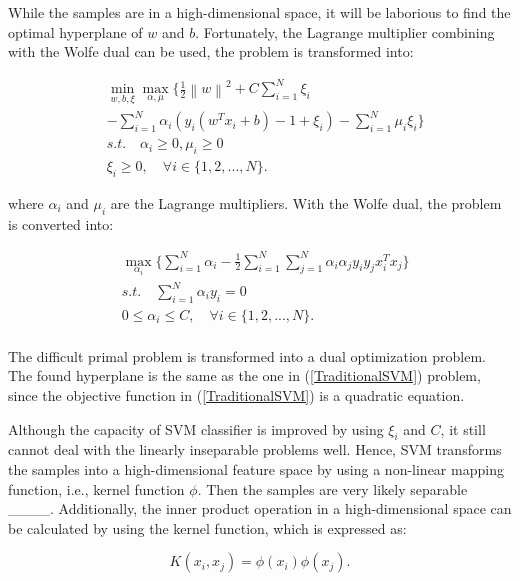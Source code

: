 While the samples are in a high-dimensional space, it will be laborious to find the optimal hyperplane of $w$ and $b$. Fortunately, the Lagrange multiplier combining with the Wolfe dual can be used, the problem is transformed into:

\begin{equation}
	\begin{split}
		&\mathop{\min}\limits_{w,b,\xi}\mathop{\max}\limits_{\alpha,\mu}\{\frac{1}{2}{\left \|w \right \|}^{2}+C\sum\limits_{i=1}^N\xi_i\\
		&-\sum\limits_{i=1}^N\alpha_i(y_i(w^Tx_i+b)-1+\xi_i)-\sum\limits_{i=1}^N\mu_i\xi_i\}\\
		& s.t. \quad \alpha_i\ge0,\mu_i\ge0\\
		&\xi_i \ge 0,\quad\forall i\in \{1,2,...,N\}.
	\end{split}
\end{equation}

where $\alpha_i$ and $\mu_i$ are the Lagrange multipliers. With the Wolfe dual, the problem is converted into:

\begin{equation}\label{dual}
	\begin{split}
		& \mathop{\max}\limits_{\alpha_i}\{\sum\limits_{i=1}^N\alpha_i
			-\frac{1}{2}\sum\limits_{i=1}^N\sum\limits_{j=1}^N\alpha_i\alpha_jy_iy_jx_i^Tx_j\}\\
		& s.t. \quad \sum\limits_{i=1}^N\alpha_iy_i = 0\\
		&0\le\alpha_i\le C,\quad\forall i\in \{1,2,...,N\}.\\
	\end{split}
\end{equation}

The difficult primal problem is transformed into a dual optimization problem. The found hyperplane is the same as the one in (\ref{TraditionalSVM}) problem, since the objective function in (\ref{TraditionalSVM}) is a quadratic equation.

Although the capacity of SVM classifier is improved by using $\xi_i$ and $ C $, it still cannot deal with the linearly inseparable problems well. Hence, SVM transforms the samples into a high-dimensional feature space by using a non-linear mapping function, i.e., kernel function $\phi$. Then the samples are very likely separable ____. Additionally, the inner product operation in a high-dimensional space can be calculated by using the kernel function, which is expressed as:

\begin{equation}
	K(x_i,x_j)=\phi(x_i)\phi(x_j).
\end{equation}

